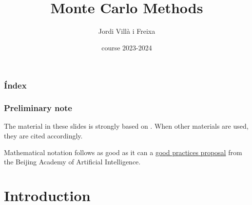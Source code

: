\documentclass{beamer}
\title[Monte Carlo Methods]{Monte Carlo Methods} %
\author{Jordi Villà i Freixa} %
\institute[FCTE] %
{
Universitat de Vic - Universitat Central de Catalunya \\
Study Abroad\\ %
\medskip
\textit{jordi.villa@uvic.cat} %
}
\date{course 2023-2024}
\begin{document}
\begin{frame}
\titlepage %
\end{frame}

\begin{frame}
\frametitle{Índex} %
\tableofcontents %
\end{frame}

\begin{frame}
  \frametitle{Preliminary note}
  The material in these slides is strongly based on \cite{kroese2020}. When other materials are used, they are cited accordingly.

  Mathematical notation follows as good as it can a \href{https://ctan.math.utah.edu/ctan/tex-archive/macros/latex/contrib/mlmath/mlmath.pdf}{good practices proposal} from the Beijing Academy of Artificial Intelligence.
  \end{frame}

\section{Introduction} %

\end{document}
